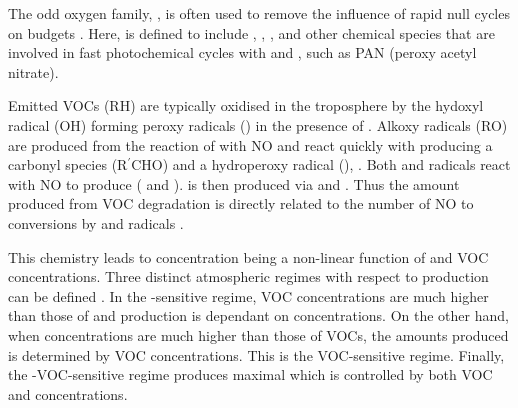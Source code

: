 The odd oxygen family, , is often used to remove the influence of rapid null cycles on  budgets \citep{Seinfeld:2006}. 
Here,  is defined to include , , ,  and other chemical species that are involved in fast photochemical cycles with  and , such as PAN (peroxy acetyl nitrate).

Emitted VOCs (RH) are typically oxidised in the troposphere by the hydoxyl radical (OH) forming peroxy radicals () in the presence of  . 
Alkoxy radicals (RO) are produced from the reaction of  with NO  and react quickly with  producing a carbonyl species (R$^{\prime}$CHO) and a hydroperoxy radical (), .
Both  and  radicals react with NO to produce  ( and ).
 is then produced via  and . 
Thus the  amount produced from VOC degradation is directly related to the number of NO to  conversions by  and  radicals \citep{Atkinson:2000}.
\begin{reactionlist}
\end{reactionlist}

This chemistry leads to  concentration being a non-linear function of  and VOC concentrations.
Three distinct atmospheric regimes with respect to  production can be defined \citep{Jenkin:2000}. 
In the -sensitive regime, VOC concentrations are much higher than those of  and  production is dependant on  concentrations. 
On the other hand, when  concentrations are much higher than those of VOCs, the  amounts produced is determined by VOC concentrations. 
This is the VOC-sensitive regime. 
Finally, the -VOC-sensitive regime produces maximal  which is controlled by both VOC and  concentrations.

